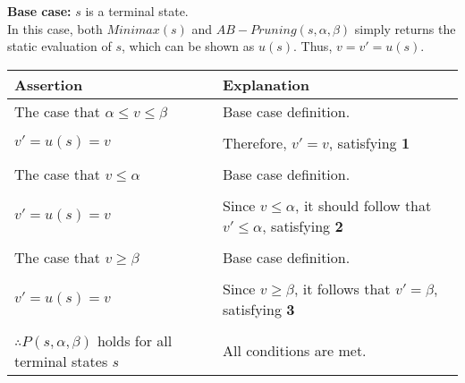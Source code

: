 \documentclass[11pt]{article}
\newenvironment{answercols}
  {\begin{center}\begin{tabular}{p{0.45\textwidth}p{0.45\textwidth}}
   \toprule
   \textbf{Assertion} & \textbf{Explanation} \\
   \midrule}
  {\\ \bottomrule\end{tabular}\end{center}}
\begin{document}
    \newpage

    {\noindent \textbf {Base case: } $s$ is a terminal state.}
    \\
    In this case, both $Minimax(s)$ and $AB-Pruning(s, \alpha, \beta)$ simply returns the static evaluation of $s$, which can be shown as $u(s)$. Thus, $v = v' = u(s)$.

    \begin{answercols}
        The case that $\alpha \le v \le \beta$ &
        Base case definition. \\
        \\ 
        $v' = u(s) = v$ &
        Therefore, $v' = v$, satisfying \textbf{1} \\
        \\
        The case that $v \le \alpha$ &
        Base case definition. \\
        \\
        $v' = u(s) = v$ &
        Since $v \le \alpha$, it should follow that $v' \le \alpha$, satisfying \textbf{2} \\
        \\
        The case that $v \ge \beta$ &
        Base case definition. \\
        \\
        $v' = u(s) = v$ &
        Since $v \ge \beta$, it follows that $v' = \beta$, satisfying \textbf{3} \\
        \\
        $\therefore P(s, \alpha, \beta)$ holds for all terminal states $s$ &
        All conditions are met.
    \end{answercols}

    \newpage
\end{document}
